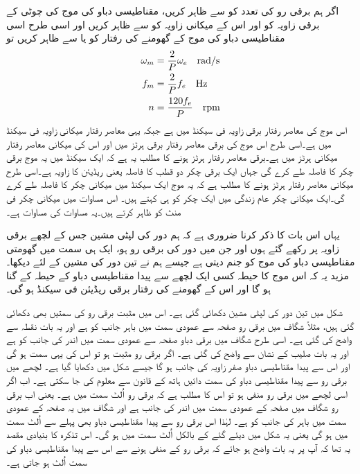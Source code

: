 اگر ہم برقی رو کی تعدد کو  سے ظاہر کریں، مقناطیسی دباو کی موج کی چوٹی کے برقی زاویہ کو   اور اس کے میکانی زاویہ کو  سے ظاہر کریں اور اسی طرح اسی مقناطیسی دباو کی موج کے گھومنے کی رفتار کو  یا  سے ظاہر کریں تو
\begin{gather}
\begin{aligned}\label{مساوات_گھومتے_مشین_برقی_میکانی_رفتار_تعلق}
\omega_m&=\frac{2}{P} \omega_e \quad \si{\radian / \second}\\
f_m&=\frac{2}{P} f_e \quad \si{\hertz}\\
n&=\frac{120 f_e}{P} \quad \textup{rpm}
\end{aligned}
\end{gather}
 اس موج کی معاصر رفتار  برقی زاویہ فی سیکنڈ میں ہے جبکہ   یہی معاصر رفتار میکانی زاویہ فی سیکنڈ میں ہے۔اسی طرح  اس موج کی برقی  معاصر رفتار برقی ہرٹز میں اور  اس کی میکانی معاصر رفتار میکانی ہرٹز میں ہے۔برقی معاصر رفتار   ہرٹز ہونے کا مطلب یہ ہے کہ ایک سیکنڈ میں یہ موج  برقی چکر کا فاصلہ طے کرے گی جہاں ایک برقی چکر دو قطب کا فاصلہ یعنی   ریڈیئن کا زاویہ ہے۔اسی طرح میکانی معاصر رفتار  ہرٹز ہونے کا مطلب ہے کہ یہ موج ایک سیکنڈ میں  میکانی چکر کا فاصلہ طے کرے گی۔ایک میکانی چکر عام زندگی میں ایک چکر کو ہی کہتے ہیں۔ اس مساوات میں  میکانی چکر فی منٹ  کو ظاہر کرتے ہیں۔یہ مساوات  کی مساوات ہے۔

یہاں اس بات کا ذکر کرنا ضروری ہے کہ ہم  دور کی لپٹی مشین جس کے لچھے  برقی زاویہ پر رکھے گئے ہوں اور جن میں  دور کی برقی رو  ہو، ایک ہی سمت میں گھومتی مقناطیسی دباو کی موج کو جنم دیتی ہے جیسے ہم نے تین دور کی مشین کے لئے دیکھا۔ مزید یہ کہ اس موج کا حیطہ کسی ایک لچھے سے پیدا مقناطیسی دباو کے حیطہ  کے   گنا ہو گا اور اس کے گھومنے کی رفتار  برقی ریڈیئن فی سیکنڈ ہو گی۔

شکل   میں تین دور کی لپٹی مشین دکھائی گئی ہے۔ اس میں مثبت برقی رو کی سمتیں بھی دکھائی گئی ہیں، مثلاً  شگاف میں برقی رو صفحہ سے عمودی سمت میں باہر جانب کو ہے اور یہ بات نقطہ سے واضح کی گئی ہے۔ اسی طرح  شگاف میں برقی دباو صفحہ سے عمودی سمت میں اندر کی جانب کو ہے اور یہ بات صلیب کے نشان سے واضح کی گئی ہے۔ اگر برقی رو مثبت ہو تو اس کی یہی سمت ہو گی اور اس سے پیدا مقناطیسی دباو  صفر زاویہ کی جانب ہو گا جیسے شکل میں دکھایا گیا ہے۔ لچھے میں برقی رو سے پیدا مقناطیسی دباو کی سمت دائیں ہاتھ کے قانون سے معلوم کی جا سکتی ہے۔ اب اگر اسی لچھے میں برقی رو منفی ہو تو اس کا مطلب ہے کہ برقی رو اُلٹ سمت میں ہے۔ یعنی اب برقی رو  شگاف میں صفحہ کے عمودی سمت میں اندر کی جانب ہے اور  شگاف میں یہ صفحہ کے عمودی سمت میں باہر کی جانب کو ہے۔ لہٰذا اس برقی رو سے پیدا مقناطیسی دباو بھی پہلے سے اُلٹ سمت میں ہو گی یعنی یہ شکل میں دیئے گئے    کے بالکل اُلٹ سمت میں ہو گی۔ اس تذکرہ کا بنیادی مقصد یہ تھا کہ آپ پر یہ بات واضح ہو جائے کہ برقی رو کے منفی ہونے سے اس سے پیدا مقناطیسی دباو کی سمت اُلٹ ہو جاتی ہے۔

